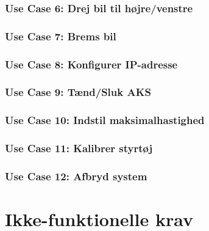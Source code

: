 \subsubsection{Use Case 6: Drej bil til højre/venstre}
\clearpage
\subsubsection{Use Case 7: Brems bil}
\clearpage
\subsubsection{Use Case 8: Konfigurer IP-adresse}
\clearpage
\subsubsection{Use Case 9: Tænd/Sluk AKS}
\clearpage
\subsubsection{Use Case 10: Indstil maksimalhastighed}
\clearpage
\subsubsection{Use Case 11: Kalibrer styrtøj}
\clearpage
\subsubsection{Use Case 12: Afbryd system}

\clearpage

\section{Ikke-funktionelle krav}

\clearpage